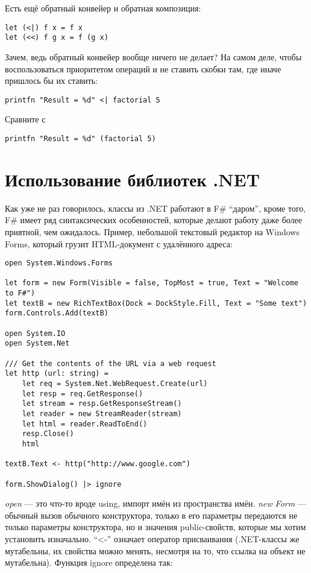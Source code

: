 \documentclass[a5paper]{article}
\begin{document}
Есть ещё обратный конвейер и обратная композиция:

\begin{verbatim}
let (<|) f x = f x
let (<<) f g x = f (g x)
\end{verbatim}

Зачем, ведь обратный конвейер вообще ничего не делает? На самом деле, чтобы воспользоваться приоритетом операций и не ставить скобки там, где иначе пришлось бы их ставить:

\begin{verbatim}
printfn "Result = %d" <| factorial 5
\end{verbatim}

Сравните с

\begin{verbatim}
printfn "Result = %d" (factorial 5)
\end{verbatim}

\section{Использование библиотек .NET}

Как уже не раз говорилось, классы из .NET работают в F\# ``даром'', кроме того, F\# имеет ряд синтаксических особенностей, которые делают работу даже более приятной, чем ожидалось. Пример, небольшой текстовый редактор на Windows Forms, который грузит HTML-документ с удалённого адреса:

\begin{verbatim}
open System.Windows.Forms

let form = new Form(Visible = false, TopMost = true, Text = "Welcome to F#")
let textB = new RichTextBox(Dock = DockStyle.Fill, Text = "Some text")
form.Controls.Add(textB)

open System.IO
open System.Net

/// Get the contents of the URL via a web request
let http (url: string) =
    let req = System.Net.WebRequest.Create(url)
    let resp = req.GetResponse()
    let stream = resp.GetResponseStream()
    let reader = new StreamReader(stream)
    let html = reader.ReadToEnd()
    resp.Close()
    html

textB.Text <- http("http://www.google.com")

form.ShowDialog() |> ignore
\end{verbatim}

\textit{open} --- это что-то вроде using, импорт имён из пространства имён. \textit{new Form} --- обычный вызов обычного конструктора, только в его параметры передаются не только параметры конструктора, но и значения public-свойств, которые мы хотим установить изначально. ``<-'' означает оператор присваивания (.NET-классы же мутабельны, их свойства можно менять, несмотря на то, что ссылка на объект не мутабельна). Функция ignore определена так:
\end{document}
